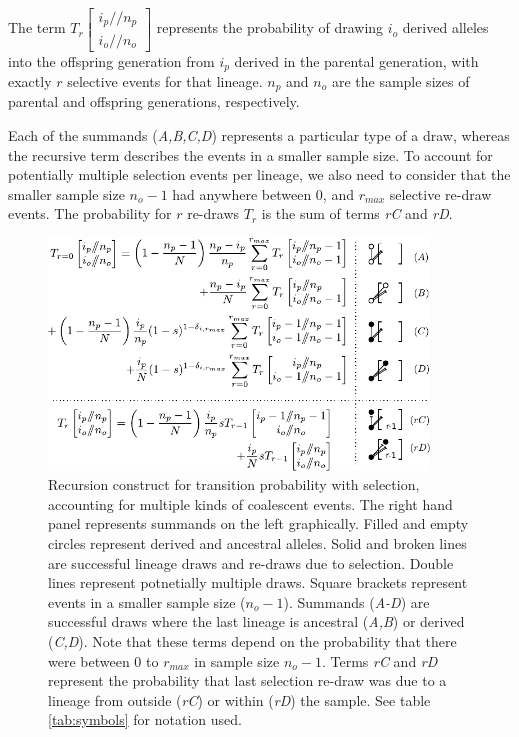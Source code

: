 \documentclass[review]{elsarticle}
\newcommand{\dslash}{/\!\!/}
\newcommand{\Coalc}[4]{\begin{bmatrix}#1\dslash #2 \\ #3\dslash #4 \end{bmatrix}}
\begin{document}
The term $T_{r}\Coalc{i_p}{n_p}{i_o}{n_o}$ represents the probability of drawing $i_o$ derived
alleles into the offspring generation from $i_p$ derived in the parental generation, with exactly
$r$ selective events for that lineage. $n_p$ and $n_o$ are the sample sizes of parental and
offspring generations, respectively.

Each of the summands (\textit{A,B,C,D}) represents a particular type of a draw, whereas the
recursive term describes the events in a smaller sample size. To account for potentially multiple
selection events per lineage, we also need to consider that the smaller sample size $n_o-1$ had
anywhere between $0$, and $r_{max}$ selective re-draw events. The probability for $r$ re-draws
$T_{r}$ is the sum of terms \textit{rC} and \textit{rD}.

\begin{figure}
  \centering
  \includegraphics[width=0.9\textwidth]{fig/recurrence-selection-dynamic-failures-annotated.pdf}

  \caption{Recursion construct for transition probability with selection, accounting for multiple
    kinds of coalescent events. The right hand panel represents summands on the left graphically.
    Filled and empty circles represent derived and ancestral alleles. Solid and broken lines are
    successful lineage draws and re-draws due to selection. Double lines represent potnetially
    multiple draws. Square brackets represent events in a smaller sample size ($n_o-1$). Summands
    (\textit{A-D}) are successful draws where the last lineage is ancestral (\textit{A,B}) or
    derived (\textit{C,D}). Note that these terms depend on the probability that there were between
    $0$ to $r_{max}$ in sample size $n_o-1$. Terms \textit{rC} and \textit{rD} represent the
    probability that last selection re-draw was due to a lineage from outside (\textit{rC}) or
    within (\textit{rD}) the sample. See table \ref{tab:symbols} for notation used. }

  \label{fig:rec-selection-dynamic-fail}
\end{figure}
 
\end{document}
